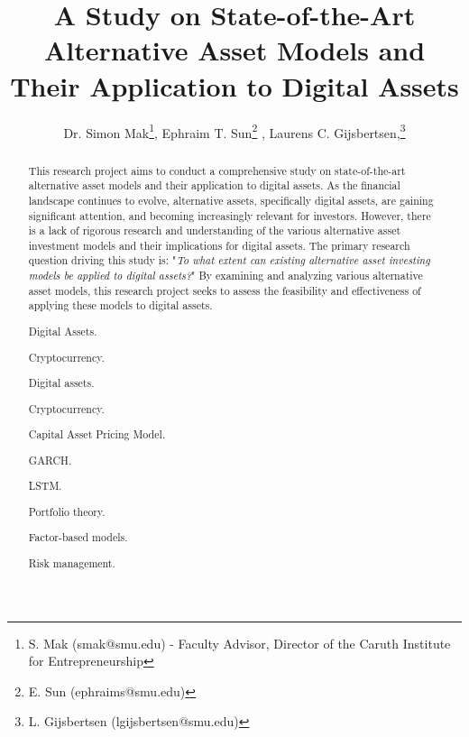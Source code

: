 \documentclass{ledger}
\title{A Study on State-of-the-Art Alternative Asset Models and Their Application to Digital Assets
}
\author{Dr. Simon Mak\thanks{S. Mak (smak@smu.edu) - Faculty Advisor, Director of the Caruth Institute for Entrepreneurship}, Ephraim T. Sun\thanks{E. Sun (ephraims@smu.edu)} , Laurens C. Gijsbertsen,\thanks{L. Gijsbertsen (lgijsbertsen@smu.edu)}}
\begin{document}
\maketitle

\thispagestyle{pagefirst}

\begin{abstract}
This research project aims to conduct a comprehensive study on state-of-the-art alternative asset models and their application to digital assets. As the financial landscape continues to evolve, alternative assets, specifically digital assets, are gaining significant attention, and becoming increasingly relevant for investors. However, there is a lack of rigorous research and understanding of the various alternative asset investment models and their implications for digital assets. The primary research question driving this study is: "\textit{To what extent can existing alternative asset investing models be applied to digital assets?}" By examining and analyzing various alternative asset models, this research project seeks to assess the feasibility and effectiveness of applying these models to digital assets.

\begin{keywords}
\item Digital Assets.
\item Cryptocurrency.
\item Digital assets.
\item Cryptocurrency.
\item Capital Asset Pricing Model.
\item GARCH.
\item LSTM.
\item Portfolio theory.
\item Factor-based models.
\item Risk management.
\end{keywords}
\end{abstract}













\ledgernotes
\end{document}
